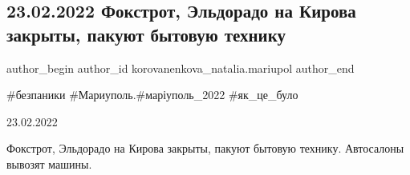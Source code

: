  
 
 
 
 

\subsection{23.02.2022  Фокстрот, Эльдорадо на Кирова закрыты, пакуют бытовую технику}
\label{sec:23_02_2023.fb.korovanenkova_natalia.mariupol.2.23_02_fokstrot_eldorado_zakryty}

\ifcmt
 author_begin
   author_id korovanenkova_natalia.mariupol
 author_end
\fi

\#безпаники \#Мариуполь.\#маріуполь\_2022 \#як\_це\_було

23.02.2022

Фокстрот, Эльдорадо на Кирова закрыты, пакуют бытовую технику. Автосалоны вывозят машины.

